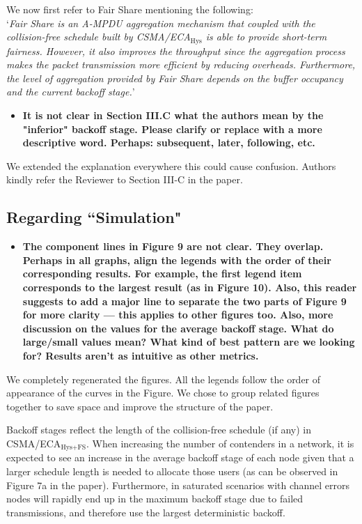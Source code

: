 \documentclass[]{article}
\begin{document}
		We now first refer to Fair Share mentioning the following:\\
		
		`\emph{Fair Share is an A-MPDU aggregation mechanism that coupled with the collision-free schedule built by CSMA/ECA$_{\text{Hys}}$ is able to provide short-term fairness. However, it also improves the throughput since the aggregation process makes the packet transmission more efficient by reducing overheads. Furthermore, the level of aggregation provided by Fair Share depends on the buffer occupancy and the current backoff stage.}'
		
		\begin{itemize}
			\item {\bfseries It is not clear in Section III.C what the authors mean by the "inferior" backoff stage. Please clarify or replace with a more descriptive word. Perhaps: subsequent, later, following, etc.}
		\end{itemize}
		
		We extended the explanation everywhere this could cause confusion. Authors kindly refer the Reviewer to Section III-C in the paper.
		
	\subsection{Regarding ``Simulation"}
		\begin{itemize}
			\item {\bfseries The component lines in Figure 9 are not clear. They overlap. Perhaps in all graphs, align the legends with the order of their corresponding results. For example, the first legend item corresponds to the largest result (as in Figure 10). Also, this reader suggests to add a major line to separate the two parts of Figure 9 for more clarity --- this applies to other figures too. Also, more discussion on the values for the average backoff stage. What do large/small values mean? What kind of best pattern are we looking for? Results aren't as intuitive as other metrics.}
		\end{itemize}
		
		We completely regenerated the figures. All the legends follow the order of appearance of the curves in the Figure. We chose to group related figures together to save space and improve the structure of the paper.
		
		Backoff stages reflect the length of the collision-free schedule (if any) in CSMA/ECA$_{\text{Hys+FS}}$. When increasing the number of contenders in a network, it is expected to see an increase in the average backoff stage of each node given that a larger schedule length is needed to allocate those users (as can be observed in Figure 7a in the paper). Furthermore, in saturated scenarios with channel errors nodes will rapidly end up in the maximum backoff stage due to failed transmissions, and therefore use the largest deterministic backoff.
			
\end{document}
